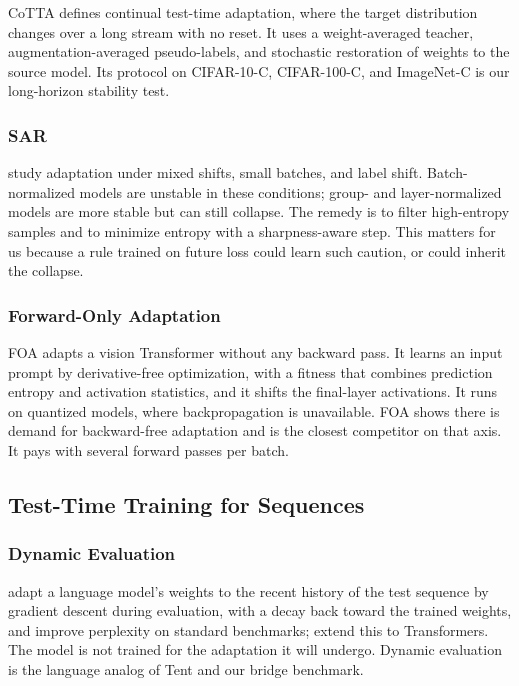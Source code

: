 \documentclass{article}
\begin{document}
CoTTA \parencite{wang2022cotta} defines continual test-time adaptation, where
the target distribution changes over a long stream with no reset. It uses a
weight-averaged teacher, augmentation-averaged pseudo-labels, and stochastic
restoration of weights to the source model. Its protocol on CIFAR-10-C,
CIFAR-100-C, and ImageNet-C is our long-horizon stability test.

\subsubsection{SAR}

\textcite{niu2023sar} study adaptation under mixed shifts, small batches, and
label shift. Batch-normalized models are unstable in these conditions; group-
and layer-normalized models are more stable but can still collapse. The remedy
is to filter high-entropy samples and to minimize entropy with a
sharpness-aware step. This matters for us because a rule trained on future loss
could learn such caution, or could inherit the collapse.

\subsubsection{Forward-Only Adaptation}

FOA \parencite{niu2024foa} adapts a vision Transformer without any backward
pass. It learns an input prompt by derivative-free optimization, with a fitness
that combines prediction entropy and activation statistics, and it shifts the
final-layer activations. It runs on quantized models, where backpropagation is
unavailable. FOA shows there is demand for backward-free adaptation and is the
closest competitor on that axis. It pays with several forward passes per batch.

\subsection{Test-Time Training for Sequences}
\label{sec:tttseq}

\subsubsection{Dynamic Evaluation}

\textcite{krause2018dynamic} adapt a language model's weights to the recent
history of the test sequence by gradient descent during evaluation, with a
decay back toward the trained weights, and improve perplexity on standard
benchmarks; \textcite{krause2019dynamic} extend this to Transformers. The model
is not trained for the adaptation it will undergo. Dynamic evaluation is the
language analog of Tent and our bridge benchmark.
\end{document}
